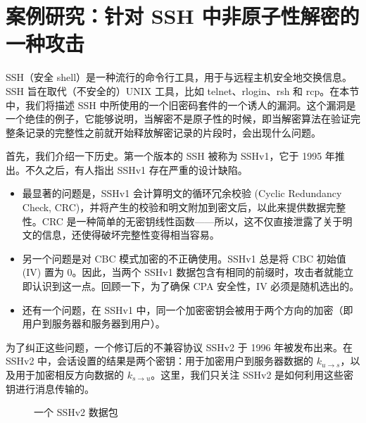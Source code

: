 \section{案例研究：针对 SSH 中非原子性解密的一种攻击}\label{sec:9-9}

SSH（安全 shell）是一种流行的命令行工具，用于与远程主机安全地交换信息。SSH 旨在取代（不安全的）UNIX 工具，比如 telnet、rlogin、rsh 和 rcp。在本节中，我们将描述 SSH 中所使用的一个旧密码套件的一个诱人的漏洞。这个漏洞是一个绝佳的例子，它能够说明，当解密不是原子性的时候，即当解密算法在验证完整条记录的完整性之前就开始释放解密记录的片段时，会出现什么问题。

首先，我们介绍一下历史。第一个版本的 SSH 被称为 SSHv1，它于 1995 年推出。不久之后，有人指出 SSHv1 存在严重的设计缺陷。
\begin{itemize}
	\item 最显著的问题是，SSHv1 会计算明文的循环冗余校验 (Cyclic Redundancy Check, CRC)，并将产生的校验和明文附加到密文后，以此来提供数据完整性。CRC 是一种简单的无密钥线性函数——所以，这不仅直接泄露了关于明文的信息，还使得破坏完整性变得相当容易。
	\item 另一个问题是对 CBC 模式加密的不正确使用。SSHv1 总是将 CBC 初始值 (IV) 置为 $0$。因此，当两个 SSHv1 数据包含有相同的前缀时，攻击者就能立即认识到这一点。回顾一下，为了确保 CPA 安全性，IV 必须是随机选出的。
	\item 还有一个问题，在 SSHv1 中，同一个加密密钥会被用于两个方向的加密（即用户到服务器和服务器到用户）。
\end{itemize}
为了纠正这些问题，一个修订后的不兼容协议 SSHv2 于 1996 年被发布出来。在 SSHv2 中，会话设置的结果是两个密钥：用于加密用户到服务器数据的 $k_{u\to s}$，以及用于加密相反方向数据的 $k_{s\to u}$。这里，我们只关注 SSHv2 是如何利用这些密钥进行消息传输的。

\begin{figure}
  \centering
  
  \caption{一个 SSHv2 数据包}
  \label{fig:9-3}
\end{figure}


